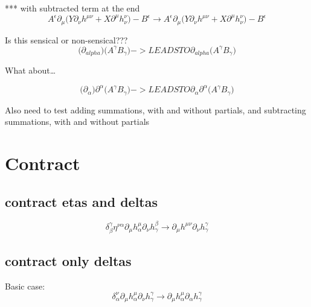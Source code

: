 \documentclass{article}
\def\){\Big)}
\def\({\Big(}
\begin{document}
*** with subtracted term at the end
\begin{equation}
A^{\epsilon} \partial_{\mu}  \(Y \partial_{\nu}h^{\mu \nu} + X \partial^{\mu} h^{\nu }_{\nu}\) - B^{\epsilon}  \rightarrow A^{\epsilon} \partial_{\mu}\(Y \partial_{\nu}h^{\mu \nu} +X \partial^{\mu}h_{\nu}^{\nu} \)- B^{\epsilon}
\end{equation}

{\color{blue}
Is this sensical or non-sensical???
\begin{equation}
\( \partial_{alpha} \) \(A^{\gamma}B_{\gamma}\) -> LEADS TO 
\partial_{alpha}\( A^{\gamma} B_{\gamma} \)
\end{equation}

What about…

\begin{equation}
\( \partial_{\alpha} \) \partial^{\alpha}\(A^{\gamma}B_{\gamma}\) -> LEADS TO
\partial_{\alpha}\partial^{\alpha}\( A^{\gamma} B_{\gamma} \)
\end{equation}
}

Also need to test adding summations, with and without partials, and subtracting summations, with and without partials\\








\section{Contract}
 \subsection{contract etas and deltas}
\begin{equation}
\delta^{\gamma}_{\beta} \eta^{\nu \alpha} \partial_{\mu} h^{\mu}_{\alpha}\partial_{\nu} h^{\beta}_{\gamma}  \rightarrow  \partial_{\mu}h^{\mu \nu} \partial_{\nu}h_{\gamma}^{\gamma}
\end{equation}

 \subsection{contract only deltas}

Basic case:
\begin{equation}
\delta^{\nu }_{\alpha} \partial_{\mu} h^{\mu}_{\alpha}\partial_{\nu} h^{\gamma}_{\gamma}  \rightarrow \partial_{\mu}h_{\alpha}^{\mu} \partial_{\alpha}h_{\gamma}^{\gamma}
\end{equation}
\end{document}
